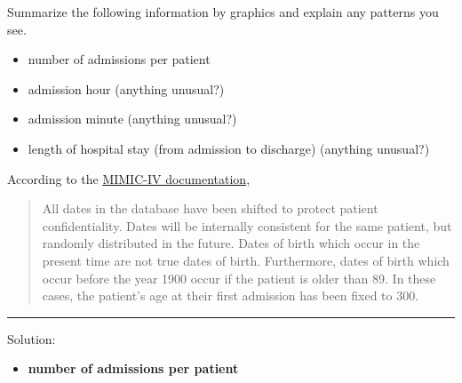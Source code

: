 \documentclass[
]{article}
\providecommand{\tightlist}{%
  \setlength{\itemsep}{0pt}\setlength{\parskip}{0pt}}\usepackage{longtable,booktabs,array}
\begin{document}
Summarize the following information by graphics and explain any patterns
you see.

\begin{itemize}
\tightlist
\item
  number of admissions per patient\\
\item
  admission hour (anything unusual?)\\
\item
  admission minute (anything unusual?)\\
\item
  length of hospital stay (from admission to discharge) (anything
  unusual?)
\end{itemize}

According to the
\href{https://mimic.mit.edu/docs/iv/about/concepts/\#date-shifting}{MIMIC-IV
documentation},

\begin{quote}
All dates in the database have been shifted to protect patient
confidentiality. Dates will be internally consistent for the same
patient, but randomly distributed in the future. Dates of birth which
occur in the present time are not true dates of birth. Furthermore,
dates of birth which occur before the year 1900 occur if the patient is
older than 89. In these cases, the patient's age at their first
admission has been fixed to 300.
\end{quote}

\begin{center}\rule{0.5\linewidth}{0.5pt}\end{center}

Solution:

\begin{itemize}
\tightlist
\item
  \textbf{number of admissions per patient}
\end{itemize}
\end{document}
